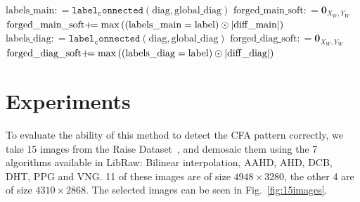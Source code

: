 \documentclass{ipol}
\newcommand{\assign}{:\!=}
\newcommand{\peq}{+\mkern-8mu=}
\begin{document}
\begin{algorithm}[h]
{                
                $\mathrm{labels\_main} \assign \mathtt{label_connected}(\mathrm{diag, global\_diag})$\;
                $\mathrm{forged\_main\_soft}\assign\mathbf0_{X_W, Y_W}$\;
                {
                        $\mathrm{forged\_main\_soft}\peq \max\left((\mathrm{labels\_main}=\mathrm{label})\odot|\mathrm{diff\_main}|\right)$\;
                }
                $\mathrm{labels\_diag} \assign \mathtt{label_connected}(\mathrm{diag, global\_diag})$\;
                $\mathrm{forged\_diag\_soft}\assign\mathbf0_{X_W, Y_W}$\;
                {
                        $\mathrm{forged\_diag\_soft}\peq \max\left((\mathrm{labels\_diag}=\mathrm{label})\odot|\mathrm{diff\_diag}|\right)$\;
                }
                
                

        }
\end{algorithm}


\clearpage



\section{Experiments}
To evaluate the ability of this method to detect the CFA pattern correctly, we take 15 images from the Raise Dataset~\cite{raise}, and demosaic them using the 7 algorithms available in LibRaw: Bilinear interpolation, AAHD, AHD, DCB, DHT, PPG and VNG. 11 of these images are of size $4948\times3280$, the other 4 are of size $4310\times2868$. The selected images can be seen in Fig.~\ref{fig:15images}.
\end{document}
